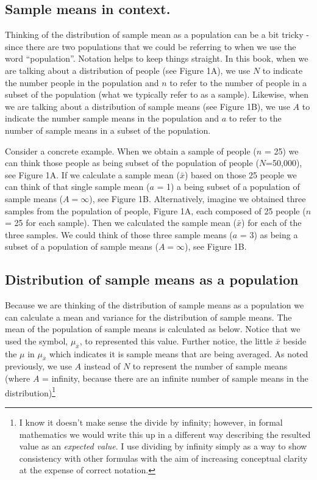 \documentclass[
]{krantz}
\begin{document}
\hypertarget{sample-means-in-context.}{%
\subsection{Sample means in context.}\label{sample-means-in-context.}}

Thinking of the distribution of sample mean as a population can be a bit tricky - since there are two populations that we could be referring to when we use the word ``population''. Notation helps to keep things straight. In this book, when we are talking about a distribution of people (see Figure 1A), we use \(N\) to indicate the number people in the population and \(n\) to refer to the number of people in a subset of the population (what we typically refer to as a sample). Likewise, when we are talking about a distribution of sample means (see Figure 1B), we use \(A\) to indicate the number sample means in the population and \(a\) to refer to the number of sample means in a subset of the population.

Consider a concrete example. When we obtain a sample of people (\(n\) = 25) we can think those people as being subset of the population of people (\(N\)=50,000), see Figure 1A. If we calculate a sample mean (\(\bar{x}\)) based on those 25 people we can think of that single sample mean (\(a\) = 1) a being subset of a population of sample means (\(A = \infty\)), see Figure 1B. Alternatively, imagine we obtained three samples from the population of people, Figure 1A, each composed of 25 people (\(n\) = 25 for each sample). Then we calculated the sample mean (\(\bar{x}\)) for each of the three samples. We could think of those three sample means (\(a\) = 3) as being a subset of a population of sample means (\(A = \infty\)), see Figure 1B.

\hypertarget{distribution-of-sample-means-as-a-population}{%
\subsection{Distribution of sample means as a population}\label{distribution-of-sample-means-as-a-population}}

Because we are thinking of the distribution of sample means as a population we can calculate a mean and variance for the distribution of sample means. The mean of the population of sample means is calculated as below. Notice that we used the symbol, \(\mu_{\bar{x}}\), to represented this value. Further notice, the little \(\bar{x}\) beside the \(\mu\) in \(\mu_{\bar{x}}\) which indicates it is sample means that are being averaged. As noted previously, we use \(A\) instead of \(N\) to represent the number of sample means (where \(A\) = infinity, because there are an infinite number of sample means in the distribution)\footnote{I know it doesn't make sense the divide by infinity; however, in formal mathematics we would write this up in a different way describing the resulted value as an \emph{expected value}. I use dividing by infinity simply as a way to show consistency with other formulas with the aim of increasing conceptual clarity at the expense of correct notation.}
\end{document}
